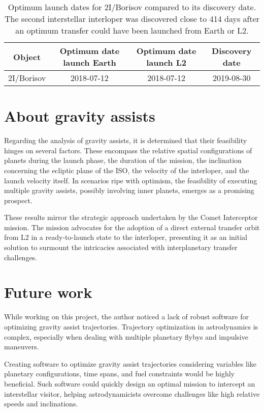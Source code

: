 \vspace{1cm}
\begin{table}[H]
    \centering
    \begin{tabular}{|c|c|c|c|}
    \hline
    Object       & Optimum date launch Earth & Optimum date launch L2 & Discovery date \\
    \hline
    2I/Borisov   & 2018-07-12                 & 2018-07-12             & 2019-08-30     \\
    \hline
    \end{tabular}
    \caption[Optimum launch dates for 2I/Borisov compared to discovery its
        discovery date]{Optimum launch dates for
        2I/Borisov compared to its discovery date. The second interstellar
        interloper was discovered close to 414 days after an optimum transfer
        could have been launched from Earth or L2.}
    \label{tab:optimum-launch-dates-borisov}
\end{table}

\section{About gravity assists}

Regarding the analysis of gravity assists, it is determined that their
feasibility hinges on several factors. These encompass the relative spatial
configurations of planets during the launch phase, the duration of the mission,
the inclination concerning the ecliptic plane of the ISO, the velocity of the
interloper, and the launch velocity itself. In scenarios ripe with optimism, the
feasibility of executing multiple gravity assists, possibly involving inner
planets, emerges as a promising prospect.

These results mirror the strategic approach undertaken by the Comet Interceptor
mission. The mission advocates for the adoption of a direct external transfer
orbit from L2 in a ready-to-launch state to the interloper, presenting it as an
initial solution to surmount the intricacies associated with interplanetary
transfer challenges.

\section{Future work}

While working on this project, the author noticed a lack of robust software for
optimizing gravity assist trajectories. Trajectory optimization in astrodynamics
is complex, especially when dealing with multiple planetary flybys and impulsive
maneuvers.

Creating software to optimize gravity assist trajectories considering variables
like planetary configurations, time spans, and fuel constraints would be highly
beneficial. Such software could quickly design an optimal mission to intercept
an interstellar visitor, helping astrodynamicists overcome challenges like high
relative speeds and inclinations.
